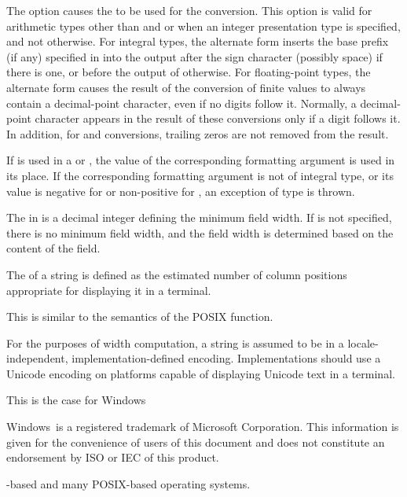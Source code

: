 \pnum
The \tcode{\#} option causes the
to be used for the conversion.
This option is valid for arithmetic types other than
 and 
or when an integer presentation type is specified, and not otherwise.
For integral types,
the alternate form inserts the
base prefix (if any) specified in 
into the output after the sign character (possibly space) if there is one, or
before the output of  otherwise.
For floating-point types,
the alternate form causes the result of the conversion of finite values
to always contain a decimal-point character,
even if no digits follow it.
Normally, a decimal-point character appears in the result of these
conversions only if a digit follows it.
In addition, for  and  conversions,
trailing zeros are not removed from the result.

\pnum
If  is used in
a  or ,
the value of the corresponding formatting argument is used in its place.
If the corresponding formatting argument is not of integral type, or
its value is
negative for  or
non-positive for ,
an exception of type  is thrown.

\pnum
The  in
 is a decimal integer defining the minimum field width.
If  is not specified,
there is no minimum field width, and
the field width is determined based on the content of the field.

\pnum
{}%
The  of a string is defined as
the estimated number of column positions appropriate
for displaying it in a terminal.
\begin{note}
This is similar to the semantics of the POSIX  function.
\end{note}

\pnum
For the purposes of width computation,
a string is assumed to be in
a locale-independent, implementation-defined encoding.
Implementations should use a Unicode encoding
on platforms capable of displaying Unicode text in a terminal.
\begin{note}
This is the case for Windows
\begin{footnote}
Windows\textregistered\ is a registered trademark of Microsoft Corporation.
This information is given for the convenience of users of this document and
does not constitute an endorsement by ISO or IEC of this product.
\end{footnote}%
-based and
many POSIX-based operating systems.
\end{note}

